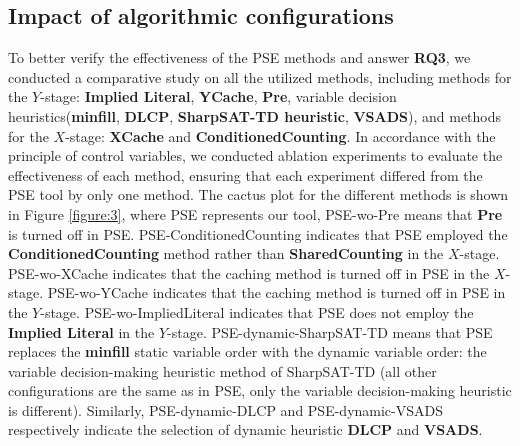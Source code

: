 \subsection{Impact of algorithmic configurations}
To better verify the effectiveness of the PSE methods and answer \textbf{RQ3}, we conducted a comparative study on all the utilized methods, including methods for the $Y$-stage: \textbf{Implied Literal}, \textbf{YCache}, \textbf{Pre}, variable decision heuristics(\textbf{minfill}, \textbf{DLCP}, \textbf{SharpSAT-TD heuristic}, \textbf{VSADS}), and methods for the $X$-stage: \textbf{XCache} and \textbf{ConditionedCounting}.
In accordance with the principle of control variables, we conducted ablation experiments to evaluate the effectiveness of each method, ensuring that each experiment differed from the PSE tool by only one method.
The cactus plot for the different methods is shown in Figure \ref{figure:3}, where PSE represents our tool, PSE-wo-Pre means that \textbf{Pre} is turned off in PSE.
PSE-ConditionedCounting indicates that PSE employed the \textbf{ConditionedCounting} method rather than \textbf{SharedCounting} in the $X$-stage.
PSE-wo-XCache indicates that the caching method is turned off in PSE in the $X$-stage. 
PSE-wo-YCache indicates that the caching method is turned off in PSE in the $Y$-stage.
PSE-wo-ImpliedLiteral indicates that PSE does not employ the \textbf{Implied Literal} in the $Y$-stage.
PSE-dynamic-SharpSAT-TD means that PSE replaces the \textbf{minfill} static variable order with the dynamic variable order: the variable decision-making heuristic method of SharpSAT-TD (all other configurations are the same as in PSE, only the variable decision-making heuristic is different).
Similarly, PSE-dynamic-DLCP and PSE-dynamic-VSADS respectively indicate the selection of dynamic heuristic \textbf{DLCP} and \textbf{VSADS}.


